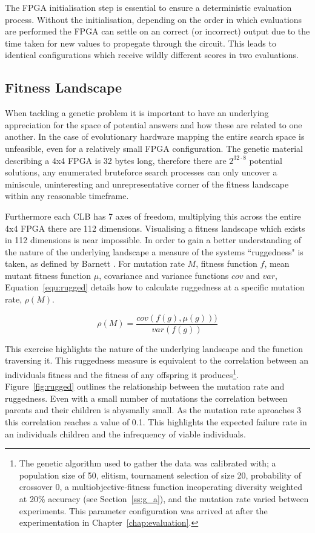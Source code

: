 The FPGA initialisation step is essential to ensure a deterministic evaluation
process. Without the initialisation, depending on the order in which evaluations
are performed the FPGA can settle on an correct (or incorrect) output due to the
time taken for new values to propegate through the circuit. This leads to identical
configurations which receive wildly different scores in two evaluations.

\subsection{Fitness Landscape}

When tackling a genetic problem it is important to have an underlying appreciation
for the space of potential answers and how these are related to one another.
In the case of evolutionary hardware
mapping the entire search space is unfeasible, even for a relatively small
FPGA configuration.
The genetic material describing a 4x4 FPGA
is 32 bytes long, therefore there are $2^{32\cdot8}$ potential solutions, any
enumerated bruteforce search processes can only uncover a
miniscule, uninteresting and unrepresentative corner of the fitness landscape
within any reasonable timeframe.

Furthermore each CLB has 7 axes of freedom, multiplying this across the entire 4x4 FPGA
there are 112 dimensions. Visualising a fitness landscape which exists in
112 dimensions is near impossible. In order to gain a better understanding
of the nature of the underlying landscape a measure of the systems ``ruggedness"
is taken, as defined by Barnett \cite{barnett2008ruggedness}. For mutation rate
$M$, fitness function $f$, mean mutant fitness function $\mu$, covariance and
variance functions $cov$ and $var$, Equation~\ref{equ:rugged} details how to
calculate ruggedness at a specific mutation rate, $\rho(M)$.

\begin{equation}
	\rho(M) = \frac{cov(f(g),\mu(g)))}{var(f(g))}
	\label{equ:rugged}
\end{equation}

This exercise highlights the nature of the underlying landscape and the function
traversing it.
This ruggedness measure is equivalent to the correlation between an individuals
fitness and the fitness of any offspring it produces\footnote{The genetic algorithm
used to gather the data was calibrated with; a population
size of 50, elitism, tournament selection of size 20, probability of crossover 0,
a multiobjective-fitness function incoperating diversity weighted at 20\% accuracy
(see Section~\ref{ss:g_a}), and the mutation rate varied between experiments. This parameter
configuration was arrived at after the experimentation in Chapter~\ref{chap:evaluation}.}.
Figure~\ref{fig:rugged} outlines the relationship between the mutation rate and
ruggedness. Even with a small number of mutations the correlation between parents
and their children is abysmally small. As the mutation rate aproaches 3 this correlation
reaches a value of 0.1. This highlights the expected failure rate in an individuals children
and the infrequency of viable individuals.



